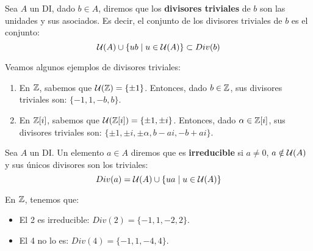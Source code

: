 \begin{definicion}
    Sea $A$ un DI, dado $b \in A$, diremos que los \textbf{divisores triviales} de $b$ son las unidades y sus asociados.
    Es decir, el conjunto de los divisores triviales de $b$ es el conjunto:
    $$\mathcal{U}(A) \cup \{ub \mid u \in \mathcal{U}(A) \} \subset Div(b)$$
\end{definicion}

\begin{ejemplo} Veamos algunos ejemplos de divisores triviales:
\begin{enumerate}
    \item En $\mathbb Z$, sabemos que $\mathcal{U}(\mathbb Z)=\{\pm 1\}$. Entonces, dado $b \in \mathbb Z$, sus divisores triviales son: $\{-1, 1, -b, b\}$.

    \item En $\mathbb Z[i]$, sabemos que $\mathcal{U}(\mathbb Z[i])=\{\pm 1, \pm i\}$. Entonces, dado $\alpha \in \mathbb Z[i]$, sus divisores triviales son: $\{\pm 1, \pm i, \pm \alpha, b-ai, -b+ai\}$.
\end{enumerate}
\end{ejemplo}

\begin{definicion}[Irreducible]
    Sea $A$ un DI. Un elemento $a \in A$ diremos que es \textbf{irreducible} si $a \neq 0$, $a \notin \mathcal{U}(A)$ y sus únicos
    divisores son los triviales:
    $$Div(a) = \mathcal{U}(A) \cup \{ua \mid u \in \mathcal{U}(A) \}$$
\end{definicion}

\begin{ejemplo} En $\mathbb Z$, tenemos que:
\begin{itemize}
    \item El 2 es irreducible: $Div(2) = \{-1, 1, -2, 2\}$.
    \item El 4 no lo es: $Div(4) = \{-1, 1, -4, 4\}$.
\end{itemize}
\end{ejemplo}

